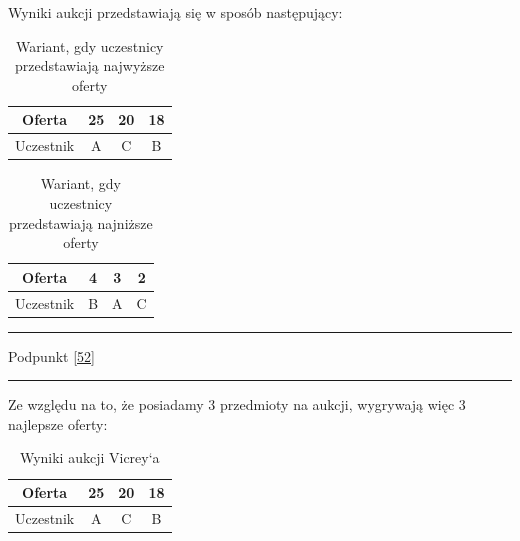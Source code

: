 \documentclass[
    12pt, %
]{../fphw}
\begin{document}
Wyniki aukcji przedstawiają się w sposób następujący: \\
\begin{table}[H]
    \centering
    \begin{tabular}{ | c | c | c | c |}
        \hline
        Oferta    & 25 & 20 & 18 \\
        \hline
        Uczestnik & A  & C  & B  \\
        \hline
    \end{tabular}
    \caption{Wariant, gdy uczestnicy przedstawiają najwyższe oferty}
\end{table}

\begin{table}[H]
    \centering
    \begin{tabular}{ | c | c | c | c |}
        \hline
        Oferta    & 4 & 3 & 2 \\
        \hline
        Uczestnik & B & A & C \\
        \hline
    \end{tabular}
    \caption{Wariant, gdy uczestnicy przedstawiają najniższe oferty}
\end{table}

\par\noindent\rule{\textwidth}{0.4pt}
Podpunkt \ref{52}
\par\noindent\rule{\textwidth}{0.4pt}

Ze względu na to, że posiadamy 3 przedmioty na aukcji,
wygrywają więc 3 najlepsze oferty:
\begin{table}[H]
    \centering
    \begin{tabular}{ | c | c | c | c |}
        \hline
        Oferta    & 25 & 20 & 18 \\
        \hline
        Uczestnik & A  & C  & B  \\
        \hline
    \end{tabular}
    \caption{Wyniki aukcji Vicrey‘a}
\end{table}
\end{document}
